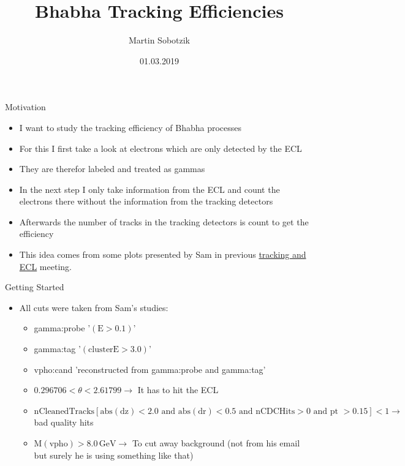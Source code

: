\documentclass[10pt]{beamer}
\title{Bhabha Tracking Efficiencies}
\date{01.03.2019}
\author{Martin Sobotzik}
\institute{Johannes Gutenberg Universit\"at Mainz}
\begin{document}
\maketitle
{%



\begin{frame}{Motivation}

\begin{itemize}	
	\item I want to study the tracking efficiency of Bhabha processes
	\item For this I first take a look at electrons which are only detected by the ECL
	\item They are therefor labeled and treated as gammas
	\item In the next step I only take information from the ECL and count the electrons there without the information from the tracking detectors
	\item Afterwards the number of tracks in the tracking detectors is count to get the efficiency
	\item This idea comes from some plots presented by Sam in previous  \href{https://confluence.desy.de/display/BI/ECL+Meetings?preview=/84320165/109161400/SCunliffe181123-ECL.pdf}{tracking and ECL} meeting. 

\end{itemize}
\end{frame}
	
\begin{frame}{Getting Started}
	
\begin{itemize} 
	\item All cuts were taken from Sam's studies:
	
	
	\begin{itemize}
		\item gamma:probe '$(\textrm{E} > 0.1 )$'
		\item gamma:tag '$(\textrm{clusterE} > 3.0)$'
		\item vpho:cand 'reconstructed from gamma:probe and gamma:tag'
	\end{itemize}

	
		\begin{itemize}
			\item $0.296706 < \theta < 2.61799 \rightarrow$ It has to hit the ECL
			\item $\textrm{nCleanedTracks}[ \textrm{abs}(\textrm{dz}) < 2.0 \textrm{ and } \textrm{abs}(\textrm{dr}) < 0.5 \textrm{ and nCDCHits} > 0 \textrm{ and pt } > 0.15] < 1 \rightarrow $ bad quality hits 
			\item $\textrm{M}(\textrm{vpho}) > 8.0\,\textrm{GeV} \rightarrow $ To cut away background (not from his email but surely he is using something like that)					
		\end{itemize}
	

\end{itemize}
\end{frame}}
\end{document}
